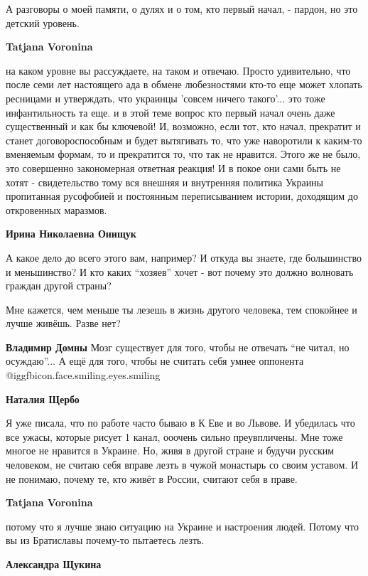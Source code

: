 \begin{itemize}
\begin{itemize}
А разговоры о моей памяти, о дулях и о том, кто первый начал, - пардон, но это
детский уровень.

\textbf{Tatjana Voronina} 

на каком уровне вы рассуждаете, на таком и отвечаю. Просто удивительно, что после
семи лет настоящего ада в обмене любезностями кто-то еще может хлопать
ресницами и утверждать, что украинцы 'совсем ничего такого'... это тоже
инфантильность та еще. и в этой теме вопрос кто первый начал очень даже
существенный и как бы ключевой! И, возможно, если тот, кто начал, прекратит и
станет договороспособным и будет вытягивать то, что уже наворотили к каким-то
вменяемым формам, то и прекратится то, что так не нравится. Этого же не было, это
совершенно закономерная ответная реакция! И в покое они сами быть не хотят -
свидетельство тому вся внешняя и внутренняя политика Украины пропитанная
русофобией и постоянным переписыванием истории, доходящим до откровенных
маразмов.

\textbf{Ирина Николаевна Онищук} 

А какое дело до всего этого вам, например? И откуда вы знаете, где большинство
и меньшинство? И кто каких \enquote{хозяев} хочет - вот почему это должно волновать
граждан другой страны?

Мне кажется, чем меньше ты лезешь в жизнь другого человека, тем спокойнее и
лучше живёшь. Разве нет?


\textbf{Владимир Домны}
Мозг существует для того, чтобы не отвечать \enquote{не читал, но осуждаю}...
А ещё для того, чтобы не считать себя умнее оппонента  @igg{fbicon.face.smiling.eyes.smiling} 

\textbf{Наталия Щербо}

Я уже писала, что по работе часто бываю в К Еве и во Львове. И убедилась что
все ужасы, которые рисует 1 канал, ооочень сильно преувпличены. Мне тоже многое
не нравится в Украине. Но, живя в другой стране и будучи русским человеком, не
считаю себя вправе лезть в чужой монастырь со своим уставом. И не понимаю,
почему те, кто живёт в России, считают себя в праве.

\textbf{Tatjana Voronina} 

потому что я лучше знаю ситуацию на Украине и настроения людей. Потому что вы
из Братиславы почему-то пытаетесь лезть.

\textbf{Александра Щукина} 


\end{itemize}
\end{itemize}
